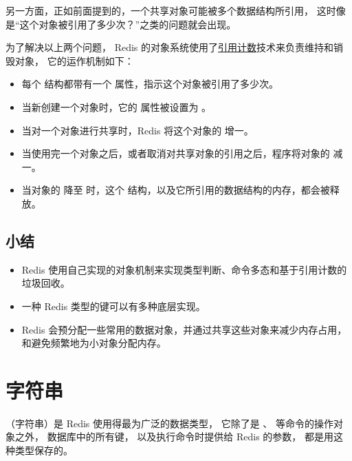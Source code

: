 \documentclass[a4paper,11pt,english]{sphinxmanual}
\begin{document}
另一方面，正如前面提到的，一个共享对象可能被多个数据结构所引用，
这时像是“这个对象被引用了多少次？”之类的问题就会出现。

为了解决以上两个问题，
Redis 的对象系统使用了\href{http://en.wikipedia.org/wiki/Reference\_counting}{引用计数}技术来负责维持和销毁对象，
它的运作机制如下：
\begin{itemize}
\item {} 
每个  结构都带有一个  属性，指示这个对象被引用了多少次。

\item {} 
当新创建一个对象时，它的  属性被设置为  。

\item {} 
当对一个对象进行共享时，Redis 将这个对象的  增一。

\item {} 
当使用完一个对象之后，或者取消对共享对象的引用之后，程序将对象的  减一。

\item {} 
当对象的  降至  时，这个  结构，以及它所引用的数据结构的内存，都会被释放。

\end{itemize}


\subsection{小结}
\label{datatype/object:id6}\begin{itemize}
\item {} 
Redis 使用自己实现的对象机制来实现类型判断、命令多态和基于引用计数的垃圾回收。

\item {} 
一种 Redis 类型的键可以有多种底层实现。

\item {} 
Redis 会预分配一些常用的数据对象，并通过共享这些对象来减少内存占用，和避免频繁地为小对象分配内存。

\end{itemize}


\section{字符串}
\label{datatype/string::doc}\label{datatype/string:string-chapter}\label{datatype/string:id1}
 （字符串）是 Redis 使用得最为广泛的数据类型，
它除了是  、  等命令的操作对象之外，
数据库中的所有键，
以及执行命令时提供给 Redis 的参数，
都是用这种类型保存的。
\end{document}
